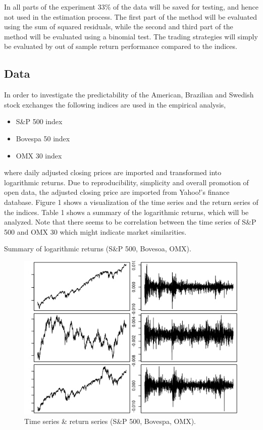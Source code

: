 \documentclass[12pt, letterpaper]{amsart}%
\begin{document}
In all parts of the experiment 33\% of the data will be saved for testing, and hence not used in the estimation process. The first part of the method will be evaluated using the sum of squared residuals, while the second and third part of the method will be evaluated using a binomial test. The trading strategies will simply be evaluated by out of sample return performance compared to the indices.

\subsection{Data}
In order to investigate the predictability of the American, Brazilian and Swedish stock exchanges the following indices are used in the empirical analysis,

\begin{itemize}  
\item S\&P 500 index
\item Bovespa 50 index
\item OMX 30 index
\end{itemize}

where daily adjusted closing prices are imported and transformed into logarithmic returns. Due to reproducibility, simplicity and overall promotion of open data, the adjusted closing price are imported from Yahoo!'s finance database. Figure 1 shows a visualization of the time series and the return series of the indices. Table 1 shows a summary of the logarithmic returns, which will be analyzed. Note that there seems to be correlation between the time series of S\&P 500 and OMX 30 which might indicate market similarities.

\begin{table}[H]
\centering
\caption{Summary of logarithmic returns (S\&P 500, Bovesoa, OMX).}
\end{table}

\begin{figure}[H]
\caption{Time series \& return series (S\&P 500, Bovespa, OMX).}
\centering
\includegraphics[scale=0.6]{data.png}
\end{figure}
\end{document}
